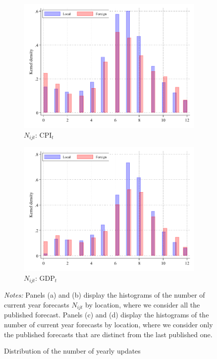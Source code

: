 \documentclass[letterpaper,12pt]{article}
\newenvironment{fignote}{\footnotesize \begin{singlespace} \noindent}{\end{singlespace} \par }
\begin{document}
\begin{figure}[H]
	\begin{subfigure}[b]{0.48\textwidth}
		\centering
		\includegraphics[width=1\linewidth]{../output/figures/cpi_current_N_density2}
		\caption{$N_{ijt}$: $\text{CPI}_{t}$ }
		\label{fig:cpi_current_N_density2}
	\end{subfigure}
	\hfill
	\begin{subfigure}[b]{0.48\textwidth}
		\centering
		\includegraphics[width=1\linewidth]{../output/figures/gdp_current_N_density2}
		\caption{$N_{ijt}$: $\text{GDP}_{t}$}
		\label{fig:gdp_current_N_density2}
	\end{subfigure}
	
	\caption{Distribution of the number of yearly updates}
	\label{fig:updates}
	\begin{fignote}
		\textit{Notes:} Panels (a) and (b) display the histograms of the number of current year forecasts $N_{ijt}$ by location, where we consider all the published forecast. Panels (c) and (d) display the histograms of the number of current year forecasts by location, where we consider only the published forecasts that are distinct from the last published one.
	\end{fignote}
\end{figure}
\end{document}
